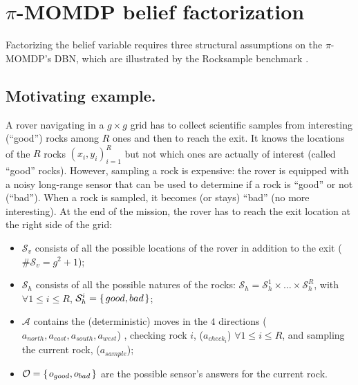 \section{$\pi$-MOMDP belief factorization}
Factorizing the belief variable requires three structural assumptions on the 
$\pi$-MOMDP's DBN, which are illustrated by the Rocksample benchmark 
\cite{Smith:2004:HSV:1036843.1036906}.
\subsection{Motivating example.}
\label{section_RS_motivatingEx}
A rover navigating in a $g \times g$ grid has to collect scientific samples from 
interesting (``good'') rocks among $R$ ones and then to reach the exit.
It knows the locations of the $R$ rocks $(x_i,y_i)_{i=1}^R$ 
but not which ones are actually of interest (called ``good'' rocks). 
However, sampling a rock is expensive: 
the rover is equipped with a noisy long-range sensor that can be used to determine 
if a rock is ``good'' or not (``bad''). 
When a rock is sampled, 
it becomes (or stays) ``bad'' (no more interesting). 
At the end of the mission, the rover has to reach the exit location at the right side of the grid:
\begin{itemize}
\item $\mathcal{S}_{v}$ consists of all the possible locations of the rover %
in addition to the exit ($\# \mathcal{S}_v = g^2 +1$);
\item $\mathcal{S}_h$ consists of all the possible natures of the rocks:
$\mathcal{S}_h = \mathcal{S}^1_h \times \ldots \times \mathcal{S}^R_h$,
with $\forall 1 \leqslant i \leqslant R$, $\mathcal{S}^i_h=\left\{ \left.  good,bad  \right. \right\}$;
\item $\mathcal{A}$ contains the (deterministic) moves in the $4$ directions ($a_{north},a_{east},a_{south},a_{west}$)
, checking rock $i$, ($a_{check_i}$) 
$\forall 1 \leqslant i \leqslant R $, 
and sampling the current rock, ($a_{sample}$);
\item $\mathcal{O} = \left\{ \left.  o_{good},o_{bad}  \right. \right\}$ are the possible sensor's answers for the current rock. 
\end{itemize}

